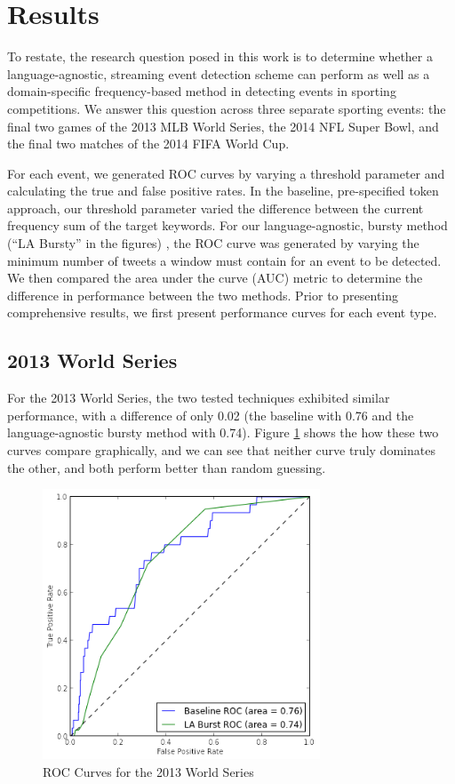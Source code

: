 \documentclass{acm_proc_article-sp}
\begin{document}
\section{Results}

To restate, the research question posed in this work is to determine whether a language-agnostic, streaming event detection scheme can perform as well as a domain-specific frequency-based method in detecting events in sporting competitions.
We answer this question across three separate sporting events: the final two games of the 2013 MLB World Series, the 2014 NFL Super Bowl, and the final two matches of the 2014 FIFA World Cup.

For each event, we generated ROC curves by varying a threshold parameter and calculating the true and false positive rates.
In the baseline, pre-specified token approach, our threshold parameter varied the difference between the current frequency sum of the target keywords.
For our language-agnostic, bursty method (``LA Bursty'' in the figures) , the ROC curve was generated by varying the minimum number of tweets a window must contain for an event to be detected.
We then compared the area under the curve (AUC) metric to determine the difference in performance between the two methods.
Prior to presenting comprehensive results, we first present performance curves for each event type.

\subsection{2013 World Series}

For the 2013 World Series, the two tested techniques exhibited similar performance, with a difference of only 0.02 (the baseline with 0.76 and the language-agnostic bursty method with 0.74).
Figure \ref{fig:roc2013WorldSeries} shows the how these two curves compare graphically, and we can see that neither curve truly dominates the other, and both perform better than random guessing.

\begin{figure}[hbtp]
\begin{center}
\includegraphics[width=3.25in]{./figures/roc_2013_WorldSeries.png}
\caption{ROC Curves for the 2013 World Series}
\label{fig:roc2013WorldSeries}
\end{center}
\end{figure}
\end{document}
